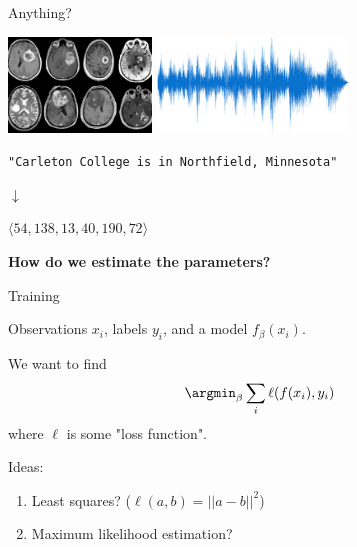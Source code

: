 \begin{frame}{Anything?}

	\qquad \includegraphics[height=1in]{brain-scans.jpg}
	\hfill	\pause
	\qquad \includegraphics[height=1in]{audio-signal.png}

	\pause \bigskip

	\begin{center}
		\texttt{"Carleton College is in Northfield, Minnesota"}

		$\downarrow$

		$\langle 54, 138, 13, 40, 190, 72 \rangle$
	\end{center}

	\pause \bigskip


	\textbf{How do we estimate the parameters?}
\end{frame}

\begin{frame}{Training}

	Observations $x_i$, labels $y_i$, and a model $f_\beta(x_i)$.

	\pause \bigskip

	We want to find
	\begin{equation}
		\argmin_\beta \sum_i \ell(f(x_i), y_i)
	\end{equation}
	where $\ell$ is some "loss function".

	\pause \bigskip

	Ideas:

	\begin{enumerate}
		\item Least squares? ($\ell(a, b) = ||a - b||^2$)
		\item Maximum likelihood estimation?
	\end{enumerate}

\end{frame}

